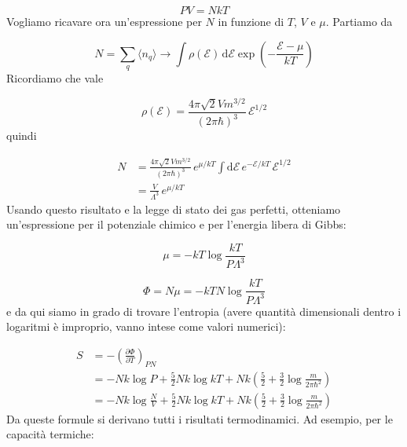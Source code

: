 \documentclass[a4paper]{report}
\begin{document}
\begin{equation}
    P V = N k T
\end{equation}
Vogliamo ricavare ora un'espressione per $N$ in funzione di $T$, $V$ e $\mu$. Partiamo da

\begin{equation}
    N = \sum_q \langle n_q \rangle \rightarrow \int \rho(\mathcal{E})\,\mathrm{d}\mathcal{E} \exp\left(-\frac{\mathcal{E}-\mu}{k T}\right)
\end{equation}
Ricordiamo che vale

\begin{equation}
    \rho(\mathcal{E}) = \frac{4\pi \sqrt{2}V m^{3/2}}{(2\pi\hbar)^3}\,\mathcal{E}^{1/2}
\end{equation}
quindi

\begin{equation}
\begin{split}
    N & = \frac{4\pi \sqrt{2}V m^{3/2}}{(2\pi\hbar)^3} \,e^{\mu/k T} \int \mathrm{d}\mathcal{E}\, e^{-\mathcal{E}/k T}\,\mathcal{E}^{1/2}\\
    & = \frac{V}{\Lambda^3}\,e^{\mu/k T}
\end{split}
\end{equation}
Usando questo risultato e la legge di stato dei gas perfetti, otteniamo un'espressione per il potenziale chimico e per l'energia libera di Gibbs:

\begin{equation}
    \mu = -k T \log \frac{k T}{P \Lambda^3}
\end{equation}

\begin{equation}
    \Phi = N\mu = -k T N \log \frac{k T}{P \Lambda^3}
\end{equation}
e da qui siamo in grado di trovare l'entropia (avere quantità dimensionali dentro i logaritmi è improprio, vanno intese come valori numerici):

\begin{equation}
    \begin{split}
        S & = -\left(\frac{\partial \Phi}{\partial T}\right)_{PN} \\
        & =  - N k \log P + \frac{5}{2} N k \log k T + N k \left(\frac{5}{2}+\frac{3}{2}\log\frac{m}{2\pi\hbar^2}\right) \\
        & = - N k \log \frac{N}{V} + \frac{5}{2} N k \log k T + N k \left(\frac{5}{2}+\frac{3}{2}\log\frac{m}{2\pi\hbar^2}\right)
    \end{split}
\end{equation}
Da queste formule si derivano tutti i risultati termodinamici. Ad esempio, per le capacità termiche:
\end{document}
